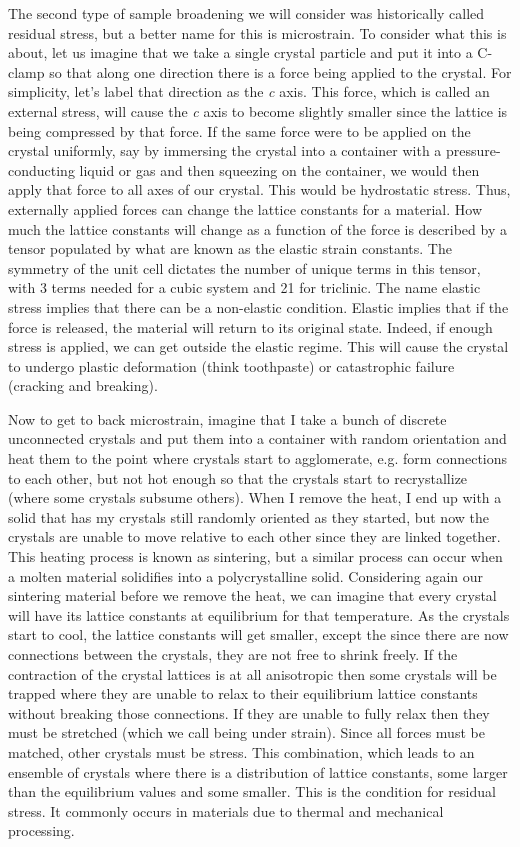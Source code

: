 The second type of sample broadening we will consider was historically called residual stress, but a better name for this is microstrain. To consider what this is about, let us imagine that we take a single crystal particle and put it into a C-clamp so that along one direction there is a force being applied to the crystal. For simplicity, let’s label that direction as the\textit{ c} axis. This force, which is called an external stress, will cause the \textit{c} axis to become slightly smaller since the lattice is being compressed by that force. If the same force were to be applied on the crystal uniformly, say by immersing the crystal into a container with a pressure-conducting liquid or gas and then squeezing on the container, we would then apply that force to all axes of our crystal. This would be hydrostatic stress. Thus, externally applied forces can change the lattice constants for a material. How much the lattice constants will change as a function of the force is described by a tensor populated by what are known as the elastic strain constants. The symmetry of the unit cell dictates the number of unique terms in this tensor, with 3 terms needed for a cubic system and 21 for triclinic. The name elastic stress implies that there can be a non-elastic condition. Elastic implies that if the force is released, the material will return to its original state. Indeed, if enough stress is applied, we can get outside the elastic regime. This will cause the crystal to undergo plastic deformation (think toothpaste) or catastrophic failure (cracking and breaking). 

 Now to get to back microstrain, imagine that I take a bunch of discrete unconnected crystals and put them into a container with random orientation and heat them to the point where crystals start to agglomerate, e.g. form connections to each other, but not hot enough so that the crystals start to recrystallize (where some crystals subsume others). When I remove the heat, I end up with a solid that has my crystals still randomly oriented as they started, but now the crystals are unable to move relative to each other since they are linked together. This heating process is known as sintering, but a similar process can occur when a molten material solidifies into a polycrystalline solid. Considering again our sintering material before we remove the heat, we can imagine that every crystal will have its lattice constants at equilibrium for that temperature. As the crystals start to cool, the lattice constants will get smaller, except the since there are now connections between the crystals, they are not free to shrink freely. If the contraction of the crystal lattices is at all anisotropic then some crystals will be trapped where they are unable to relax to their equilibrium lattice constants without breaking those connections. If they are unable to fully relax then they must be stretched (which we call being under strain). Since all forces must be matched, other crystals must be stress. This combination, which leads to an ensemble of crystals where there is a distribution of lattice constants, some larger than the equilibrium values and some smaller. This is the condition for residual stress. It commonly occurs in materials due to thermal and mechanical processing. 

